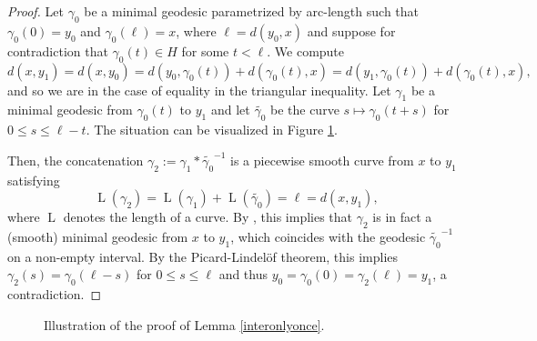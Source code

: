 \documentclass[11pt,twoside]{amsart}
\theoremstyle{plain}
\DeclareMathOperator\leng{L}
\begin{document}
\begin{proof}
Let $\gamma_0$ be a minimal geodesic parametrized by arc-length such that $\gamma_0(0)=y_0$ and $\gamma_0(\ell)=x$, where $\ell=d(y_0,x)$ and suppose for contradiction that $\gamma_0(t)\in H$ for some $t<\ell$. We compute
\[d(x,y_1)=d(x,y_0)=d(y_0,\gamma_0(t))+d(\gamma_0(t),x)=d(y_1,\gamma_0(t))+d(\gamma_0(t),x),\]
and so we are in the case of equality in the triangular inequality. Let $\gamma_1$ be a minimal geodesic from $\gamma_0(t)$ to $y_1$ and let $\widetilde{\gamma_0}$ be the curve $s\mapsto \gamma_0(t+s)$ for $0\le s\le \ell-t$. The situation can be visualized in Figure \ref{illus_iteronlyonce}.

Then, the concatenation $\gamma_2:=\gamma_1\ast \widetilde{\gamma_0}^{-1}$ is a piecewise smooth curve from $x$ to $y_1$ satisfying
\[\leng(\gamma_2)=\leng(\gamma_1)+\leng(\widetilde{\gamma_0})=\ell=d(x,y_1),\]
where $\leng$ denotes the length of a curve. By \cite[Chapter 3, Corollary 3.9]{do_carmo_riemannian}, this implies that $\gamma_2$ is in fact a (smooth) minimal geodesic from $x$ to $y_1$, which coincides with the geodesic $\widetilde{\gamma_0}^{-1}$ on a non-empty interval. By the Picard-Lindel\"{o}f theorem, this implies $\gamma_2(s)=\gamma_0(\ell-s)$ for $0\le s \le \ell$ and thus $y_0=\gamma_0(0)=\gamma_2(\ell)=y_1$, a contradiction.
\end{proof}
\begin{center}
\begin{figure}[h!]
\centering
{}
\caption{Illustration of the proof of Lemma \ref{interonlyonce}.}\label{illus_iteronlyonce}
\end{figure}
\end{center}
\end{document}

